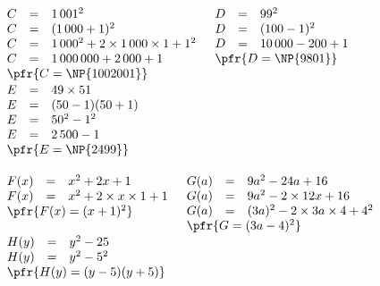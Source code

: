 \documentclass[10pt,openright,twoside,french]{book}
\begin{document}
\begin{Exemple}[s]
    $\begin{array}[t]{rcl}%
        C & = & 1\,001^2 \\
        C & = & (1\,000 + 1)^2 \\
        C & = & 1\,000^2 + 2 \times 1\,000 \times 1 + 1^2\\
        C & = & 1\,000\,000 + 2\,000 + 1 \\
        \multicolumn{3}{l}{\pfr{C = \NP{1002001}}}
    \end{array}$
    $\begin{array}[t]{rcl}%
        D & = & 99^2 \\
        D & = & (100 - 1)^2 \\
        D & = & 10\,000 - 200 + 1 \\
        \multicolumn{3}{l}{\pfr{D = \NP{9801}}}
    \end{array}$
    $\begin{array}[t]{rcl}%
        E & = & 49 \times 51 \\
        E & = & (50 - 1)(50 + 1) \\
        E & = & 50^2 - 1^2 \\
        E & = & 2\,500 - 1 \\
        \multicolumn{3}{l}{\pfr{E = \NP{2499}}}
    \end{array}$
\end{Exemple}\medskip
%
\begin{Exemple}[s]
    $\begin{array}[t]{rcl}
        F(x) & = & x^2 + 2x + 1 \\
        F(x) & = & x^2 + 2 \times x \times 1 + 1 \\
        \multicolumn{3}{l}{\pfr{F(x) = (x + 1)^2}}
    \end{array}$
    $\begin{array}[t]{rcl}
        G(a) & = & 9a^2 - 24a + 16 \\
        G(a) & = & 9a^2 - 2 \times 12x + 16 \\
        G(a) & = & (3a)^2 - 2 \times 3a \times 4 + 4^2\\
        \multicolumn{3}{l}{\pfr{G = (3a - 4)^2}}
    \end{array}$
    $\begin{array}[t]{rcl}
        H(y) & = & y^2 - 25 \\
        H(y) & = &  y^2 - 5^2\\
        \multicolumn{3}{l}{\pfr{H(y) = (y - 5)(y + 5)}}
    \end{array}$
\end{Exemple}\medskip
\end{document}
